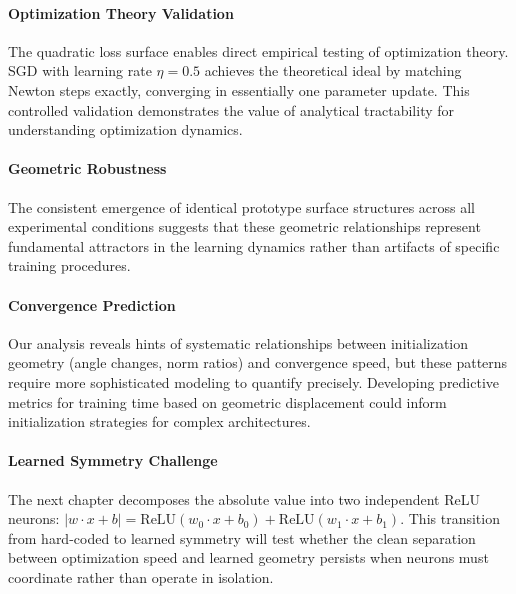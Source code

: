 \paragraph{Optimization Theory Validation}
The quadratic loss surface enables direct empirical testing of optimization theory. SGD with learning rate $\eta=0.5$ achieves the theoretical ideal by matching Newton steps exactly, converging in essentially one parameter update. This controlled validation demonstrates the value of analytical tractability for understanding optimization dynamics.

\paragraph{Geometric Robustness}
The consistent emergence of identical prototype surface structures across all experimental conditions suggests that these geometric relationships represent fundamental attractors in the learning dynamics rather than artifacts of specific training procedures.

\paragraph{Convergence Prediction}
Our analysis reveals hints of systematic relationships between initialization geometry (angle changes, norm ratios) and convergence speed, but these patterns require more sophisticated modeling to quantify precisely. Developing predictive metrics for training time based on geometric displacement could inform initialization strategies for complex architectures.

\paragraph{Learned Symmetry Challenge}
The next chapter decomposes the absolute value into two independent ReLU neurons: $|w \cdot x + b| = \text{ReLU}(w_0 \cdot x + b_0) + \text{ReLU}(w_1 \cdot x + b_1)$. This transition from hard-coded to learned symmetry will test whether the clean separation between optimization speed and learned geometry persists when neurons must coordinate rather than operate in isolation.
